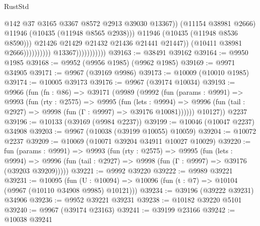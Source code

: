 \begin{lexlean}{RustStd}
\begin{coremodule}
                                                        @142
                                                        @37
                                                        @3165
                                                        @3367
                                                        @8572
                                                        @2913
                                                        @39030
                                                        @13367))
                                                    (@11154 @38981 @2666)
                                                    @11946
                                                    (@10435 (@11948 @8565 @2938)))
                                                  @11946
                                                  (@10435 (@11948 @8536 @8590)))
                                                @21426
                                                @21429
                                                @21432
                                                @21436
                                                @21441
                                                @21447))
                                            (@10411 @38981 @2666))))))))))
                          @13367)))))))))))
@39163 := @38491 @39162
@39164 := @9950 @1985
@39168 := @9952 (@9956 @1985) (@9962 @1985)
@39169 := @9971 @34905
@39171 := @9967 (@39169 @9986)
@39173 := @10009 (@10010 @1985)
@39174 := @10005 @39173
@39176 := @9967 (@39174 @10034)
@39193 := @9966
    (fun (fn : @86) =>
    @39171
      (@9989
        (@9992
          (fun (params : @9991) =>
          @9993
            (fun (rty : @2575) =>
            @9995
              (fun (lets : @9994) =>
              @9996 (fun (tail : @2927) => @9998 (fun (Γ : @9997) => @39176 @10081))))))
        @10127))
    @2237
@39196 := @10133 (@39169 (@9984 @2237))
@39199 := @10046 (@10047 @2237) @34908
@39203 := @9967 (@10038 (@39199 @10055) @10059)
@39204 := @10072 @2237
@39209 := @10069 (@10071 @39204 @34911 @10027 @10029)
@39220 := fun (params : @9991) =>
  @9993
    (fun (rty : @2575) =>
    @9995
      (fun (lets : @9994) =>
      @9996 (fun (tail : @2927) => @9998 (fun (Γ : @9997) => @39176 (@39203 @39209)))))
@39221 := @9992 @39220
@39222 := @9989 @39221
@39231 := @10095
    (fun (U : @10094) => @10096 (fun (t : @7) => @10104 (@9967 (@10110 @34908 @9985) @10121)))
@39234 := @39196 (@39222 @39231) @34906
@39236 := @9952 @39221 @39231
@39238 := @10182 @39220 @5101
@39240 := @9967 (@39174 @23163)
@39241 := @39199 @23166
@39242 := @10038 @39241

\end{coremodule}
\end{lexlean}
